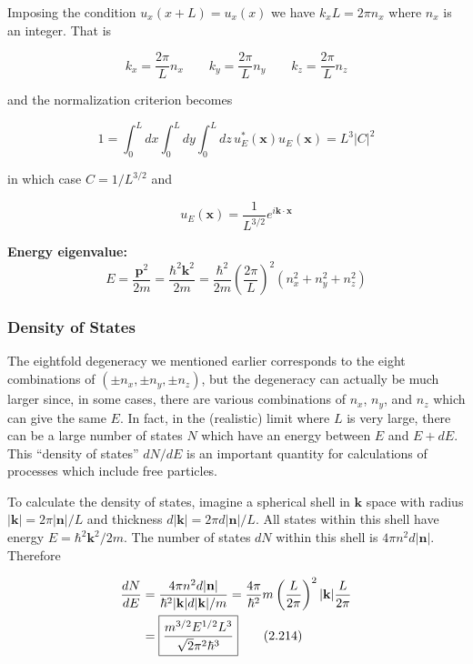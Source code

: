 \documentclass[11pt,a4paper]{article}
\begin{document}
Imposing the condition $u_x(x + L) = u_x(x)$ we have $k_x L = 2\pi n_x$ where $n_x$ is an integer. That is

\begin{equation}
k_x = \frac{2\pi}{L}n_x \qquad k_y = \frac{2\pi}{L}n_y \qquad k_z = \frac{2\pi}{L}n_z
\tag{2.210}
\end{equation}

and the normalization criterion becomes

\begin{equation}
1 = \int_0^L dx \int_0^L dy \int_0^L dz\, u_E^*(\mathbf{x})u_E(\mathbf{x}) = L^3|C|^2
\tag{2.211}
\end{equation}

in which case $C = 1/L^{3/2}$ and

\begin{equation}
\boxed{u_E(\mathbf{x}) = \frac{1}{L^{3/2}}e^{i\mathbf{k}\cdot\mathbf{x}}}
\tag{2.212}
\end{equation}

\textbf{Energy eigenvalue:}
\begin{equation}
\boxed{E = \frac{\mathbf{p}^2}{2m} = \frac{\hbar^2\mathbf{k}^2}{2m} = \frac{\hbar^2}{2m}\left(\frac{2\pi}{L}\right)^2(n_x^2 + n_y^2 + n_z^2)}
\tag{2.213}
\end{equation}

\subsubsection{Density of States}

The eightfold degeneracy we mentioned earlier corresponds to the eight combinations of $(\pm n_x, \pm n_y, \pm n_z)$, but the degeneracy can actually be much larger since, in some cases, there are various combinations of $n_x$, $n_y$, and $n_z$ which can give the same $E$. In fact, in the (realistic) limit where $L$ is very large, there can be a large number of states $N$ which have an energy between $E$ and $E + dE$. This ``density of states'' $dN/dE$ is an important quantity for calculations of processes which include free particles.

To calculate the density of states, imagine a spherical shell in $\mathbf{k}$ space with radius $|\mathbf{k}| = 2\pi|\mathbf{n}|/L$ and thickness $d|\mathbf{k}| = 2\pi d|\mathbf{n}|/L$. All states within this shell have energy $E = \hbar^2\mathbf{k}^2/2m$. The number of states $dN$ within this shell is $4\pi n^2 d|\mathbf{n}|$. Therefore

\begin{align}
\frac{dN}{dE} &= \frac{4\pi n^2 d|\mathbf{n}|}{\hbar^2|\mathbf{k}|d|\mathbf{k}|/m} = \frac{4\pi}{\hbar^2}m\left(\frac{L}{2\pi}\right)^2|\mathbf{k}|\frac{L}{2\pi} \notag \\
&= \boxed{\frac{m^{3/2}E^{1/2}L^3}{\sqrt{2}\pi^2\hbar^3}}
\tag{2.214}
\end{align}
\end{document}
